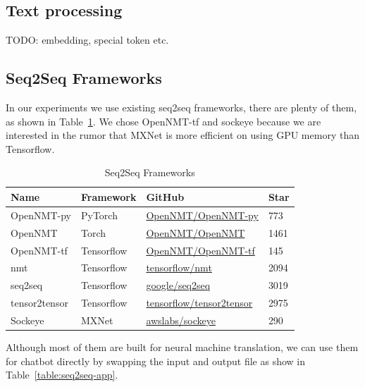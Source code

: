 \documentclass{article}
\begin{document}
\subsection{Text processing}
\label{subsec:text-processing}

TODO: embedding, special token etc.

\subsection{Seq2Seq Frameworks}
\label{subsec:seq2seq-frameworks}

In our experiments we use existing seq2seq frameworks, there are plenty of them, as shown in Table~\ref{table:seq2seq-frameworks}.
We chose OpenNMT-tf and sockeye because we are interested in the rumor that MXNet is more efficient on using GPU memory than Tensorflow.

\begin{table}[h]
    \caption{Seq2Seq Frameworks}
    \label{table:seq2seq-frameworks}
    \centering
    \begin{tabular}{llll}
        \toprule
        Name & Framework & GitHub & Star \\
        \midrule
        OpenNMT-py & PyTorch & \href{https://github.com/OpenNMT/OpenNMT-py}{OpenNMT/OpenNMT-py} & 773 \\
        OpenNMT & Torch & \href{https://github.com/OpenNMT/OpenNMT}{OpenNMT/OpenNMT} & 1461 \\
        OpenNMT-tf & Tensorflow & \href{https://github.com/OpenNMT/OpenNMT-tf}{OpenNMT/OpenNMT-tf} & 145 \\
        nmt & Tensorflow & \href{https://github.com/tensorflow/nmt}{tensorflow/nmt} & 2094 \\
        seq2seq & Tensorflow & \href{https://github.com/google/seq2seq}{google/seq2seq} & 3019 \\
        tensor2tensor & Tensorflow & \href{https://github.com/tensorflow/tensor2tensor}{tensorflow/tensor2tensor} & 2975 \\
        Sockeye & MXNet & \href{https://github.com/awslabs/sockeye}{awslabs/sockeye} & 290 \\
        \bottomrule
    \end{tabular}
\end{table}

Although most of them are built for neural machine translation, we can use them for chatbot directly by swapping the input
and output file as show in Table~\ref{table:seq2seq-app}.
\end{document}
